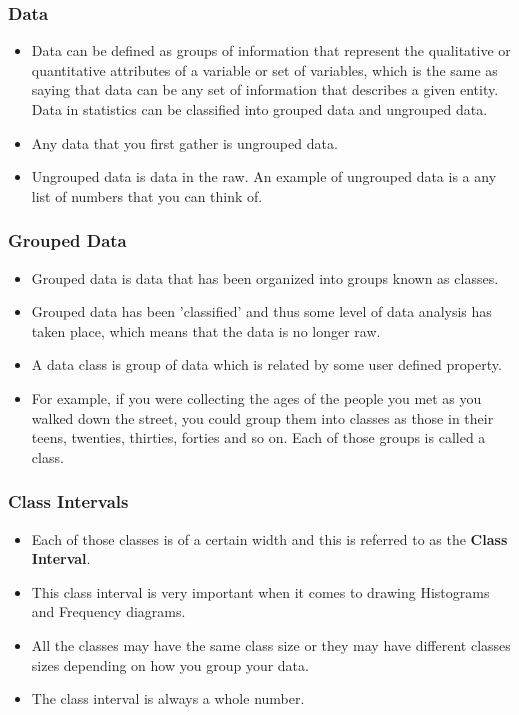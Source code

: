 \documentclass{beamer}
\begin{document}
\begin{frame}
	\frametitle{Data}
	\Large
	\begin{itemize}
		\item Data can be defined as groups of information that represent the qualitative or quantitative attributes of a variable or set of variables, which is the same as saying that data can be any set of information that describes a given entity. Data in statistics can be classified into grouped data and ungrouped data.
		
		\item Any data that you first gather is ungrouped data. 
		\item Ungrouped data is data in the raw. An example of ungrouped data is a any list of numbers that you can think of.
	\end{itemize}
\end{frame}
\begin{frame}
	\frametitle{Grouped Data}
	\Large
	\begin{itemize}
		\item Grouped data is data that has been organized into groups known as classes. 
		\item Grouped data has been 'classified' and thus some level of 
		data analysis has taken place, which means that the data is no longer raw.
		\item A data class is group of data which is related by some user defined property. 
		\item 
		For example, if you were collecting the ages of the people you met as you walked down the street, you could group them into classes as those in 
		their teens, twenties, thirties, forties and so on. Each of those groups is called a class.
	\end{itemize}
\end{frame}
\begin{frame}
	\frametitle{Class Intervals}
	\Large
	\begin{itemize}
		\item Each of those classes is of a certain width and this is referred to as the \textbf{Class Interval}. 
		\item This class interval is very important when it comes to drawing Histograms and Frequency diagrams. 
		\item All the classes may have the same class size or they may have different classes sizes depending on how you group your data. 
		\item The class interval is always a whole number.
	\end{itemize}
	
\end{frame}
\end{document}
